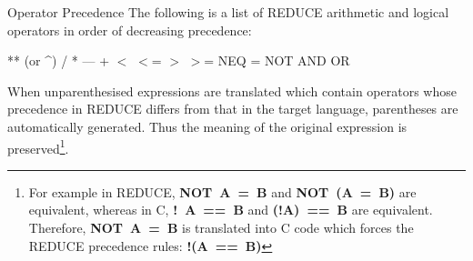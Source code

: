 \begin{describe}{Operator Precedence}
The following is a list of REDUCE arithmetic and logical
operators in order of decreasing precedence:
\begin{center}
** (or \^{})  /  *  ---  +  $<$  $<$=  $>$  $>$=  NEQ  = NOT  AND  OR
\end{center}

When unparenthesised expressions are translated which contain
operators whose precedence in REDUCE differs from that in the
target language, parentheses are automatically generated.  Thus
the meaning of the original expression is preserved\footnote{
For example in REDUCE, {\bf NOT~A~=~B} and {\bf NOT~(A~=~B)}
are equivalent, whereas in C, {\bf !~A~==~B} and {\bf (!A)~==~B}
are equivalent.  Therefore, {\bf NOT~A~=~B}
is translated into C code which forces the REDUCE precedence rules:
{\bf !(A~==~B)}
}.
\end{describe}
